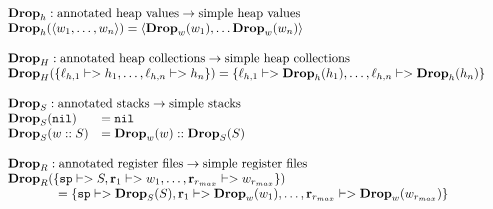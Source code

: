 {\[\begin{array}{l}
\begin{array}{l}
\mathbf{Drop}_h : \text{annotated heap values} -> \text{simple heap values} \\
\drop{h}{\langle w_1, \dots, w_n \rangle} = \langle \drop{w}{w_1}, \dots \drop{w}{w_n}\rangle \\\\

\mathbf{Drop}_H : \text{annotated heap collections} -> \text{simple heap collections} \\
\drop{H}{\{\ell_{h,1} |-> h_1, \dots, \ell_{h,n} |-> h_n\}} = \{\ell_{h,1} |-> \drop{h}{h_1}, \dots, \ell_{h,n} |-> \drop{h}{h_n}\}
\end{array} \\\\

\begin{array}{ll}
\rlap{$\mathbf{Drop}_S : \text{annotated stacks} -> \text{simple stacks}$} \\
\drop{S}{\mathtt{nil}} &= \mathtt{nil} \\
\drop{S}{w :: S} &= \drop{w}{w} :: \drop{S}{S} \\
\end{array} \\\\

\begin{array}{l}
\rlap{$\mathbf{Drop}_R : \text{annotated register files} -> \text{simple register files}$} \\
\drop{R}{\{\mathtt{sp} |-> S, \mathbf{r}_1 |-> w_1, \dots, \mathbf{r}_{r_{max}} |-> w_{r_{max}}\}}\\
\quad\quad\quad\quad = \{\mathtt{sp} |-> \drop{S}{S}, \mathbf{r}_1 |-> \drop{w}{w_1}, \dots, \mathbf{r}_{r_{max}} |-> \drop{w}{w_{r_{max}}}\}
\end{array} \\\\


\end{array}\]}

